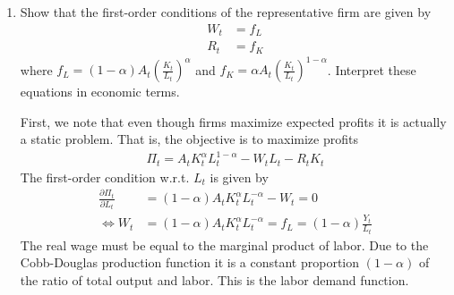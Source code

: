 \documentclass[a4paper]{scrartcl}
\begin{document}
\begin{enumerate}
\begin{solution}
		(I) in (II) yields:
		\begin{align*}
		W_t = -\frac{\frac{-\psi}{1-L_t}}{\gamma C_t^{-1}} \equiv - \frac{U_t^l}{U_t^c}
		\end{align*}
		This equation reflects intratemporal optimality, particularly, the optimal choice for labor supply: the real wage must be equal to the marginal rate of substitution between labor and consumption.
		\end{solution}
		\item Show that the first-order conditions of the representative firm are given by
		\begin{align*}
		W_t &= f_L\\
		R_t &= f_K
		\end{align*}
		where $f_L = (1-\alpha) A_t \left(\frac{K_t}{L_t}\right)^\alpha$ and $f_K = \alpha A_t \left(\frac{K_t}{L_t}\right)^{1-\alpha}$.
		Interpret these equations in economic terms.
		\begin{solution}
		First, we note that even though firms maximize expected profits it is actually a static problem. That is, the objective is to maximize profits
		\begin{align*}
			\Pi_t = A_t K_t^\alpha L_t^{1-\alpha} - W_t L_t - R_t K_t
		\end{align*}
		The first-order condition w.r.t. $L_{t}$ is given by
		\begin{align*}
		\frac{\partial \Pi_t}{\partial L_{t}} &= (1-\alpha) A_t K_t^\alpha L_t^{-\alpha} - W_t = 0\\
		\Leftrightarrow W_t &= (1-\alpha) A_t K_t^\alpha L_t^{-\alpha} = f_L = (1-\alpha) \frac{Y_t}{L_t}
		\end{align*}
		The real wage must be equal to the marginal product of labor. Due to the Cobb-Douglas production function it is a constant proportion $(1-\alpha)$ of the ratio of total output and labor. This is the labor demand function.
		

\end{solution}
\end{enumerate}
\end{document}
